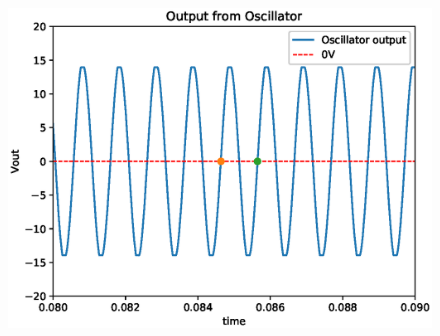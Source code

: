 \begin{enumerate}[label=\arabic*.,ref=\theenumi]
 
 \begin{figure}[!ht]
\centering
\includegraphics[width=\columnwidth]{./figs/ee18btech11044/ee18btech11044_3_3.eps}
\caption{}
\label{fig:ee18btech11044_3_plot_3}
\end{figure}
\end{enumerate}
